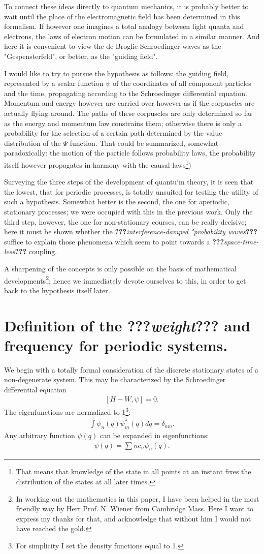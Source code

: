 \documentclass[a4paper,11pt]{article}
\newcommand{\WTF}[1]{\textbf{???}\textit{#1}\textbf{???}}
\newcommand{\?}[2]{#1\footnote{\textsc{Translator note}: #2}}
\newcommand{\nequ}[2]{\begin{align*}\tag{#1}#2\end{align*}}
\begin{document}
To connect these ideas directly to quantum mechanics, it is probably better to wait until the place of the electromagnetic field has been determined in this formalism. If however one imagines a total analogy between light quanta and electrons, the laws of electron motion can be formulated in a similar manner. And here it is convenient to view the de Broglie-Schroedinger waves as the "Gespensterfeld", or better, as the "guiding field".

I would like to try to pursue the hypothesis as follows: the guiding field, represented by a scalar function $\psi$ of the coordinates of all component particles and the time, propagating according to the Schroedinger differential equation. Momentum and energy however are carried over however as if the corpuscles are actually flying around. The paths of these corpuscles are only determined so far as the energy and momentum law constrains them; otherwise there is only a probability for the selection of a certain path determined by the value distribution of the $\Psi$ function. That could be summarized, somewhat paradoxically: the motion of the particle follows probability laws, the probability itself however propagates in harmony with the causal laws\footnote{That means that knowledge of the state in all points at an instant fixes the distribution of the states at all later times.})

Surveying the three steps of the development of quantu`m theory, it is seen that the lowest, that for periodic processes, is totally unsuited for testing the utility of such a hypothesis. Somewhat better is the second, the one for aperiodic, stationary processes; we were occupied with this in the previous work. Only the third step, however, the one for non-stationary courses, can be really decisive; here it must be shown whether the \WTF{interference-damped "probability waves} suffice to explain those phenomena which seem to point towards a \WTF{space-time-less} coupling.

A sharpening of the concepts is only possible on the basis of mathematical developments\footnote{In working out the mathematics in this paper, I have been helped in the most friendly way by Herr Prof. N. Wiener from Cambridge Mass. Here I want to express my thanks for that, and acknowledge that without him I would not have reached the gold.}; hence we immediately devote ourselves to this, in order to get back to the hypothesis itself later.

\section{Definition of the \WTF{weight} and frequency for periodic systems.} We begin with a totally formal consideration of the discrete stationary states of a non-degenerate system. This may be characterized by the Schroedinger differential equation
\nequ{1}{[H - W, \psi]=0.}
The eigenfunctions are normalized to 1\footnote{For simplicity I set the density functions equal to 1.}:
\nequ{2}{\int\psi_n(q)\psi_m^*(q)dq = \delta_{nm}.}
Any arbitrary function $\psi(q)$ can be expanded in eigenfunctions:
\nequ{3}{\psi(q)=\sum{n}c_n\psi_n(q).}
\end{document}
